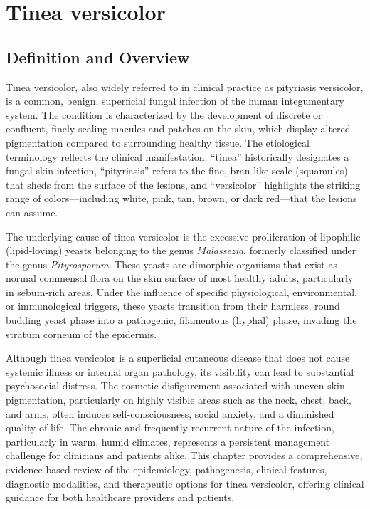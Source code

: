\chapter{Tinea versicolor}

\section*{Definition and Overview}
Tinea versicolor, also widely referred to in clinical practice as pityriasis versicolor, is a common, benign, superficial fungal infection of the human integumentary system. The condition is characterized by the development of discrete or confluent, finely scaling macules and patches on the skin, which display altered pigmentation compared to surrounding healthy tissue. The etiological terminology reflects the clinical manifestation: ``tinea'' historically designates a fungal skin infection, ``pityriasis'' refers to the fine, bran-like scale (squamules) that sheds from the surface of the lesions, and ``versicolor'' highlights the striking range of colors---including white, pink, tan, brown, or dark red---that the lesions can assume.

The underlying cause of tinea versicolor is the excessive proliferation of lipophilic (lipid-loving) yeasts belonging to the genus \textit{Malassezia}, formerly classified under the genus \textit{Pityrosporum}. These yeasts are dimorphic organisms that exist as normal commensal flora on the skin surface of most healthy adults, particularly in sebum-rich areas. Under the influence of specific physiological, environmental, or immunological triggers, these yeasts transition from their harmless, round budding yeast phase into a pathogenic, filamentous (hyphal) phase, invading the stratum corneum of the epidermis.

Although tinea versicolor is a superficial cutaneous disease that does not cause systemic illness or internal organ pathology, its visibility can lead to substantial psychosocial distress. The cosmetic disfigurement associated with uneven skin pigmentation, particularly on highly visible areas such as the neck, chest, back, and arms, often induces self-consciousness, social anxiety, and a diminished quality of life. The chronic and frequently recurrent nature of the infection, particularly in warm, humid climates, represents a persistent management challenge for clinicians and patients alike. This chapter provides a comprehensive, evidence-based review of the epidemiology, pathogenesis, clinical features, diagnostic modalities, and therapeutic options for tinea versicolor, offering clinical guidance for both healthcare providers and patients.

